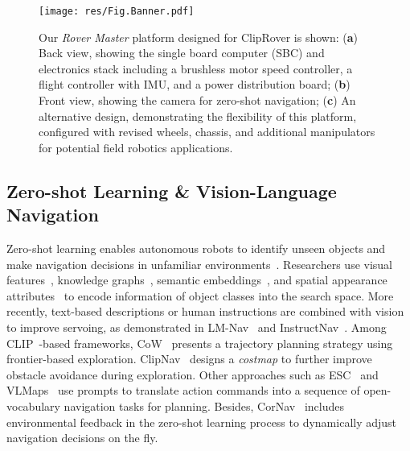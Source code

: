 
\begin{figure*}[t!]
    \centering
    \texttt{[image: res/Fig.Banner.pdf]}%
    \vspace{-1mm}
    \caption{Our \textit{Rover Master} platform designed for ClipRover is shown: (\textbf{a}) Back view, showing the single board computer (SBC) and electronics stack including a brushless motor speed controller, a flight controller with IMU, and a power distribution board;
    (\textbf{b}) Front view, showing the camera for zero-shot navigation; (\textbf{c}) An alternative design, demonstrating the flexibility of this platform, configured with revised wheels, chassis, and additional manipulators for potential field robotics applications.}
    \label{fig:system_design}
    \vspace{-1mm}
\end{figure*}


\subsection{Zero-shot Learning \& Vision-Language Navigation}

\label{sec:related-work:VLN}

Zero-shot learning enables autonomous robots to identify unseen objects and make navigation decisions in unfamiliar environments~\cite{Guan2024LOCZSONLO}. Researchers use visual features~\cite{yang2018visual}, knowledge graphs~\cite{pal2021learning}, semantic embeddings~\cite{zhao2023zero}, and spatial appearance attributes~\cite{ma2024doze} to encode information of object classes into the search space. More recently, text-based descriptions or human instructions are combined with vision to improve servoing, as demonstrated in LM-Nav~\cite{shah2023lm} and InstructNav~\cite{long2024instructnav}. Among CLIP~\cite{radford2021learning}-based frameworks, CoW~\cite{gadre2022clip} presents a trajectory planning strategy using frontier-based exploration. ClipNav~\cite{dorbala2022clipnav} designs a \textit{costmap} to further improve obstacle avoidance during exploration. Other approaches such as ESC~\cite{zhou2023esc} and VLMaps~\cite{huang2023visual} use prompts to translate action commands into a sequence of open-vocabulary navigation tasks for planning. Besides, CorNav~\cite{liang2024cornav} includes environmental feedback in the zero-shot learning process to dynamically adjust navigation decisions on the fly.

